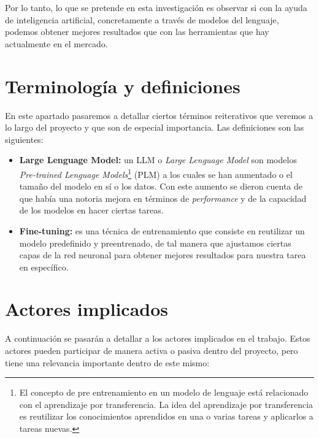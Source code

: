 Por lo tanto, lo que se pretende en esta investigación es observar si con la ayuda de inteligencia artificial, concretamente a través de modelos del lenguaje, podemos obtener mejores
resultados que con las herramientas que hay actualmente en el mercado.

\section{Terminología y definiciones}
\label{sec:terminalogia}


En este apartado pasaremos a detallar ciertos términos reiterativos que veremos a lo largo del proyecto y que son de especial importancia. Las definiciones son las siguientes:

\begin{itemize}
    \item \textbf{Large Lenguage Model:} un LLM o \textit{Large Lenguage Model} son modelos \textit{Pre-trained Lenguage Models}\footnote{El concepto de pre entrenamiento en un modelo
                                        de lenguaje está relacionado con el aprendizaje por transferencia. La idea del aprendizaje por transferencia es reutilizar los conocimientos
                                        aprendidos en una o varias tareas y aplicarlos a tareas nuevas.} (PLM) a los cuales se han aumentado o el tamaño del modelo en sí o los datos.
                                        Con este aumento se dieron cuenta de que había una notoria mejora en términos de \textit{performance} y de la capacidad de los modelos en hacer
                                        ciertas tareas. \cite{ZhaoWayneXin2023ASoL}
    \item \textbf{Fine-tuning:} es una técnica de entrenamiento que consiste en reutilizar un modelo predefinido y preentrenado, de tal manera que ajustamos ciertas capas de la
                                red neuronal para obtener mejores resultados para nuestra tarea en específico.
\end{itemize}

\section{Actores implicados}
\label{sec:terminalogia}


A continuación se pasarán a detallar a los actores implicados en el trabajo. Estos actores pueden participar de manera activa o pasiva dentro del proyecto, pero tiene una relevancia
importante dentro de este mismo:

